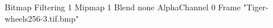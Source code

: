 {Bitmap
	{Filtering 1}
	{Mipmap 1}
	{Blend none}
	{AlphaChannel 0}
	{Frame "Tiger-wheels256-3.tif.bmp"}
}

